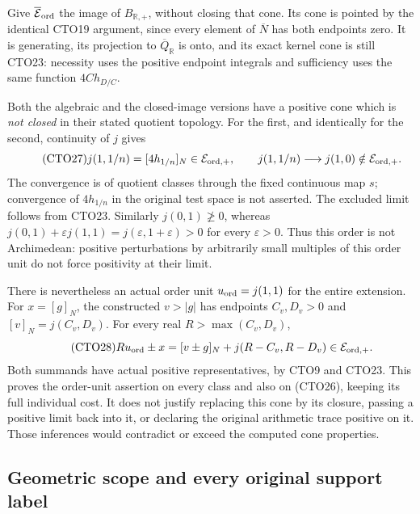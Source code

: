 Give $\overline{\mathcal E}_{\rm ord}$ the image of
$B_{\mathbb R,+}$, without closing that cone. Its cone is pointed
by the identical CTO19 argument, since every element of
$\overline N$ has both endpoints zero. It is generating, its
projection to $\overline Q_{\mathbb R}$ is onto, and its exact
kernel cone is still CTO23: necessity uses the positive endpoint
integrals and sufficiency uses the same function $4Ch_{D/C}$.

Both the algebraic and the closed-image versions have a positive
cone which is \emph{not closed} in their stated quotient topology.
For the first, and identically for the second, continuity of $j$ gives
\begin{equation}\tag{CTO27}
j(1,1/n)=[4h_{1/n}]_N\in\mathcal E_{{\rm ord},+},\qquad
j(1,1/n)\longrightarrow j(1,0)
\notin\mathcal E_{{\rm ord},+}.
\end{equation}
The convergence is of quotient classes through the fixed continuous
map $s$; convergence of $4h_{1/n}$ in the original test space is
not asserted. The excluded limit follows from CTO23. Similarly
$j(0,1)\not\ge0$, whereas
$j(0,1)+\varepsilon j(1,1)=j(\varepsilon,1+\varepsilon)>0$ for
every $\varepsilon>0$. Thus this order is not Archimedean: positive
perturbations by arbitrarily small multiples of this order unit do
not force positivity at their limit.

There is nevertheless an actual order unit $u_{\rm ord}=j(1,1)$
for the entire extension. For $x=[g]_N$, the constructed $v>|g|$
has endpoints $C_v,D_v>0$ and $[v]_N=j(C_v,D_v)$. For every
real $R>\max(C_v,D_v)$,
\begin{equation}\tag{CTO28}
Ru_{\rm ord}\pm x
=[v\pm g]_N+j(R-C_v,R-D_v)
\in\mathcal E_{{\rm ord},+}.
\end{equation}
Both summands have actual positive representatives, by CTO9 and
CTO23. This proves the order-unit assertion on every class and
also on (CTO26), keeping its full individual cost. It does not
justify replacing this cone by its closure, passing a positive
limit back into it, or declaring the original arithmetic trace
positive on it. Those inferences would contradict or exceed the
computed cone properties.

\subsection{Geometric scope and every original support label}

